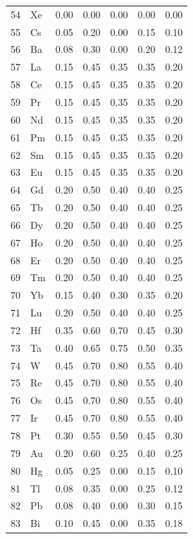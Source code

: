 \documentclass[12pt,a4paper]{article}
\begin{document}
\begin{longtable}{p{2.2cm}p{1.2cm}p{2.2cm}p{2.2cm}p{2.2cm}p{2.2cm}p{2.2cm}}
		54 & Xe  & 0.00 & 0.00 & 0.00 & 0.00 & 0.00 \\
		55 & Cs  & 0.05 & 0.20 & 0.00 & 0.15 & 0.10 \\
		56 & Ba  & 0.08 & 0.30 & 0.00 & 0.20 & 0.12 \\
		57 & La  & 0.15 & 0.45 & 0.35 & 0.35 & 0.20 \\
		58 & Ce  & 0.15 & 0.45 & 0.35 & 0.35 & 0.20 \\
		59 & Pr  & 0.15 & 0.45 & 0.35 & 0.35 & 0.20 \\
		60 & Nd  & 0.15 & 0.45 & 0.35 & 0.35 & 0.20 \\
		61 & Pm  & 0.15 & 0.45 & 0.35 & 0.35 & 0.20 \\
		62 & Sm  & 0.15 & 0.45 & 0.35 & 0.35 & 0.20 \\
		63 & Eu  & 0.15 & 0.45 & 0.35 & 0.35 & 0.20 \\
		64 & Gd  & 0.20 & 0.50 & 0.40 & 0.40 & 0.25 \\
		65 & Tb  & 0.20 & 0.50 & 0.40 & 0.40 & 0.25 \\
		66 & Dy  & 0.20 & 0.50 & 0.40 & 0.40 & 0.25 \\
		67 & Ho  & 0.20 & 0.50 & 0.40 & 0.40 & 0.25 \\
		68 & Er  & 0.20 & 0.50 & 0.40 & 0.40 & 0.25 \\
		69 & Tm  & 0.20 & 0.50 & 0.40 & 0.40 & 0.25 \\
		70 & Yb  & 0.15 & 0.40 & 0.30 & 0.35 & 0.20 \\
		71 & Lu  & 0.20 & 0.50 & 0.40 & 0.40 & 0.25 \\
		72 & Hf  & 0.35 & 0.60 & 0.70 & 0.45 & 0.30 \\
		73 & Ta  & 0.40 & 0.65 & 0.75 & 0.50 & 0.35 \\
		74 & W   & 0.45 & 0.70 & 0.80 & 0.55 & 0.40 \\
		75 & Re  & 0.45 & 0.70 & 0.80 & 0.55 & 0.40 \\
		76 & Os  & 0.45 & 0.70 & 0.80 & 0.55 & 0.40 \\
		77 & Ir  & 0.45 & 0.70 & 0.80 & 0.55 & 0.40 \\
		78 & Pt  & 0.30 & 0.55 & 0.50 & 0.45 & 0.30 \\
		79 & Au  & 0.20 & 0.60 & 0.25 & 0.40 & 0.25 \\
		80 & Hg  & 0.05 & 0.25 & 0.00 & 0.15 & 0.10 \\
		81 & Tl  & 0.08 & 0.35 & 0.00 & 0.25 & 0.12 \\
		82 & Pb  & 0.08 & 0.40 & 0.00 & 0.30 & 0.15 \\
		83 & Bi  & 0.10 & 0.45 & 0.00 & 0.35 & 0.18 \\

\end{longtable}
\end{document}
